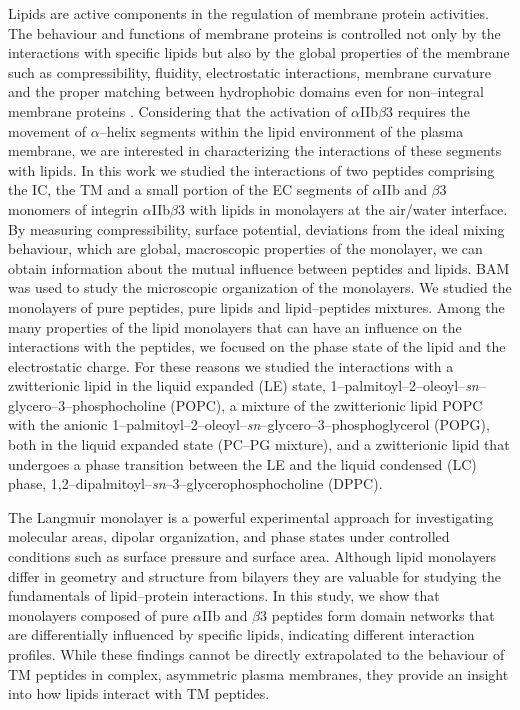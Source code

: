 \documentclass[journal=jacsat,manuscript=article]{achemso}
\begin{document}
	Lipids are active components in the regulation of membrane protein activities. The behaviour and functions of membrane proteins is controlled not only by the interactions with specific lipids but also by the global properties of the membrane such as compressibility, fluidity, electrostatic interactions, membrane curvature and the proper matching between hydrophobic domains \cite{1997_Cantor,2004_Morten} even for non–integral membrane proteins \cite{2021_Oliveira}. 
    Considering that the activation of $\alpha$IIb$\beta$3 requires the movement of $\alpha$–helix segments within the lipid environment of the plasma membrane, we are interested in characterizing the interactions of these segments with lipids. In this work we studied the interactions of two peptides comprising the IC, the TM and a small portion of the EC segments of $\alpha$IIb and $\beta$3 monomers of integrin $\alpha$IIb$\beta$3 with lipids in monolayers at the air/water interface. 
    By measuring compressibility, surface potential, deviations from the ideal mixing behaviour, which are global, macroscopic properties of the monolayer, we can obtain information about the mutual influence between peptides and lipids. BAM was used to study the microscopic organization of the monolayers. We studied the monolayers of pure peptides, pure lipids and lipid–peptides mixtures. Among the many properties of the lipid monolayers that can have an influence on the interactions with the peptides, we focused on the phase state of the lipid and the electrostatic charge. For these reasons we studied the interactions with a zwitterionic lipid in the liquid expanded (LE) state, 1–palmitoyl–2–oleoyl–\textit{sn}–glycero–3–phosphocholine (POPC), a mixture of the zwitterionic lipid POPC with the anionic 1–palmitoyl–2–oleoyl–\textit{sn}–glycero–3–phosphoglycerol (POPG), both in the liquid expanded state (PC–PG mixture), and a zwitterionic lipid that undergoes a phase transition between the LE and the liquid condensed (LC) phase, 1,2–dipalmitoyl–\textit{sn}–3–glycerophosphocholine (DPPC). 
 
    The Langmuir monolayer is a powerful experimental approach for investigating molecular areas, dipolar organization, and phase states under controlled conditions such as surface pressure and surface area. Although lipid monolayers differ in geometry and structure from bilayers they are valuable for studying the fundamentals of lipid–protein interactions. In this study, we show that monolayers composed of pure $\alpha$IIb and $\beta$3 peptides form domain networks that are differentially influenced by specific lipids, indicating different interaction profiles. While these findings cannot be directly extrapolated to the behaviour of TM peptides in complex, asymmetric plasma membranes, they provide an insight into how lipids interact with TM peptides.
\end{document}
